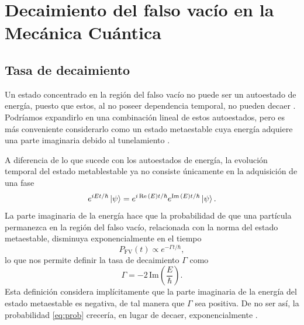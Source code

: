 \chapter{Decaimiento del falso vacío en la Mecánica Cuántica} 



\section{Tasa de decaimiento}

Un estado concentrado en la región del falso vacío no puede ser un autoestado de energía, puesto que estos, al no poseer dependencia temporal, no pueden decaer \cite{andreassen2017precision}. Podríamos expandirlo en una combinación lineal de estos autoestados, pero es más conveniente considerarlo como un estado metaestable cuya energía adquiere una parte imaginaria debido al tunelamiento  \cite{weinberg2012classical, paranjape2017theory}. 

A diferencia de lo que sucede con los autoestados de energía, la evolución temporal del estado metablestable ya no consiste únicamente en la adquisición de una fase \cite{kleinert2009path}
\begin{equation}
e^{iE t/\hbar}\ket{\psi} = e^{i\Re\qty(E) t/\hbar}e^{\Im\qty(E) t/\hbar}\ket{\psi}.
\end{equation}
La parte imaginaria de la energía hace que la probabilidad de que una partícula permanezca en la región del falso vacío, relacionada con la norma del estado metaestable, disminuya exponencialmente en el tiempo 
\begin{equation} \label{eq:prob}
P_{\text{FV}}(t) \propto e^{-\Gamma t/\hbar},
\end{equation}
lo que nos permite definir la tasa de decaimiento $\Gamma$ como
\begin{equation}\label{eq:gammaE}
\Gamma = -2 \, \mathrm{Im}\left(\frac{E}{\hbar}\right).
\end{equation} 
Esta definición considera implícitamente que la parte imaginaria de la energía del estado metaestable es negativa, de tal manera que $\Gamma$ sea positiva. De no ser así, la probabilidad \eqref{eq:prob} crecería, en lugar de decaer, exponencialmente \cite{kleinert2009path}. 

